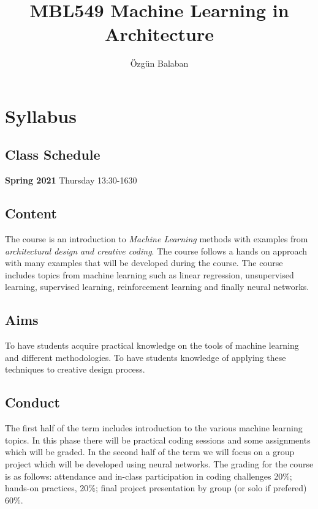 \documentclass[
]{book}
\title{MBL549 Machine Learning in Architecture}
\author{Özgün Balaban}
\date{}
\begin{document}
\maketitle

{
\setcounter{tocdepth}{1}
\tableofcontents
}
\hypertarget{intro}{%
\chapter{Syllabus}\label{intro}}

\hypertarget{class-schedule}{%
\section{Class Schedule}\label{class-schedule}}

\textbf{Spring 2021}
Thursday 13:30-1630

\hypertarget{content}{%
\section{Content}\label{content}}

The course is an introduction to \emph{Machine Learning} methods with examples from \emph{architectural design and creative coding}. The course follows a hands on approach with many examples that will be developed during the course. The course includes topics from machine learning such as linear regression, unsupervised learning, supervised learning, reinforcement learning and finally neural networks.

\hypertarget{aims}{%
\section{Aims}\label{aims}}

To have students acquire practical knowledge on the tools of machine learning and different methodologies. To have students knowledge of applying these techniques to creative design process.

\hypertarget{conduct}{%
\section{Conduct}\label{conduct}}

The first half of the term includes introduction to the various machine learning topics. In this phase there will be practical coding sessions and some assignments which will be graded. In the second half of the term we will focus on a group project which will be developed using neural networks.
The grading for the course is as follows: attendance and in-class participation in coding challenges 20\%; hands-on practices, 20\%; final project presentation by group (or solo if prefered) 60\%.
\end{document}
